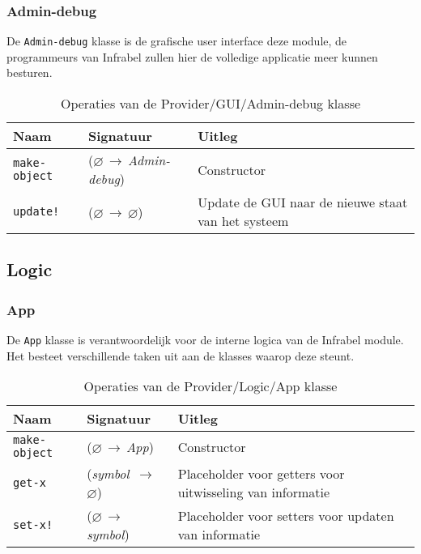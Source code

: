 \documentclass[a4paper, 11pt]{article}
\newcommand{\naar}{\,$\rightarrow$\,}
\renewcommand{\empty}{$\varnothing$}
\newcommand{\<}{\scriptsize\textless\normalsize}
\renewcommand{\>}{\scriptsize\textgreater\normalsize}
\begin{document}
\newpage

\subsubsection{Admin-debug} %
De \texttt{Admin-debug} klasse is de grafische user interface deze module, de programmeurs van Infrabel zullen hier de volledige applicatie meer kunnen besturen.
\begin{table}[H]
	\begin{center}
		\begin{tabular}{|l l l|}
			\hline
			\textbf{Naam} & \textbf{Signatuur} & \textbf{Uitleg}\\
			\hline
			\texttt{make-object} & (\empty \naar \textit{Admin-debug}) & Constructor\\
			\hline
			\texttt{update!} & (\empty \naar \empty) & Update de GUI naar de nieuwe staat van het systeem\\
			\hline
		\end{tabular}
		\caption{Operaties van de Provider/GUI/Admin-debug klasse}
	\end{center}
\end{table}

\subsection{Logic} %

\subsubsection{App} %
De \texttt{App} klasse is verantwoordelijk voor de interne logica van de Infrabel module. Het besteet verschillende taken uit aan de klasses waarop deze steunt.
\begin{table}[H]
	\begin{center}
		\begin{tabular}{|l l l|}
			\hline
			\textbf{Naam} & \textbf{Signatuur} & \textbf{Uitleg}\\
			\hline
			\texttt{make-object} & (\empty \naar \textit{App}) & Constructor\\
			\hline
			\texttt{get-x} & (\textit{symbol} \naar \empty) & Placeholder voor getters voor uitwisseling van informatie\\
			\texttt{set-x!} & (\empty \naar \textit{symbol}) & Placeholder voor setters voor updaten van informatie\\
			\hline
		\end{tabular}
		\caption{Operaties van de Provider/Logic/App klasse}
	\end{center}
\end{table}
\end{document}
